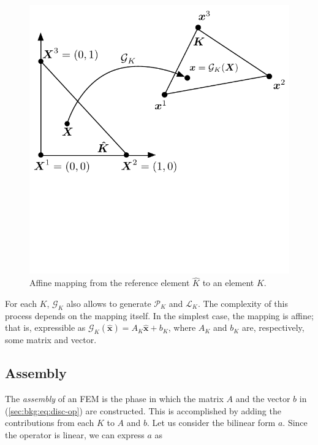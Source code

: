 \begin{figure}
\begin{CenteredBox}
\includegraphics[scale=0.8]{background/figures/reference-element}
\end{CenteredBox}
\caption{Affine mapping from the reference element $\hat{K}$ to an element $K$.}
\label{fig:bkg:reference-el}
\end{figure}

For each $K$, $\mathcal{G}_K$ also allows to generate $\mathcal{P}_K$ and $\mathcal{L}_K$.  The complexity of this process depends on the mapping itself. In the simplest case, the mapping is affine; that is, expressible as $\mathcal{G}_K(\hat{\boldsymbol{x}}) = A_K \hat{\boldsymbol{x}} + b_K$, where $A_K$ and $b_K$ are, respectively, some matrix and vector.


\subsection{Assembly}
\label{sec:bkg:assembly}
The {\em assembly} of an FEM is the phase in which the matrix $A$ and the vector $b$ in (\ref{sec:bkg:eq:disc-op}) are constructed. This is accomplished by adding the contributions from each $K$ to $A$ and $b$. Let us consider the bilinear form $a$. Since the operator is linear, we can express $a$ as

